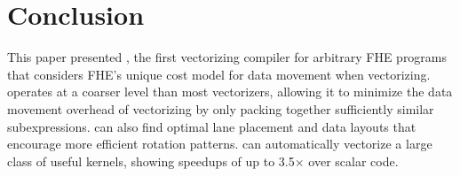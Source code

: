 \section{Conclusion}\label{sec:conclusion}
This paper presented \system, the first vectorizing compiler for arbitrary FHE programs that considers FHE's unique cost model for data movement when vectorizing.
\system operates at a coarser level than most vectorizers, allowing it to minimize the data movement overhead of vectorizing by only packing together sufficiently similar subexpressions.
\system can also find optimal lane placement and data layouts that encourage more efficient rotation patterns.
\system can automatically vectorize a large class of useful kernels, showing speedups of up to 3.5$\times$ over scalar code.

